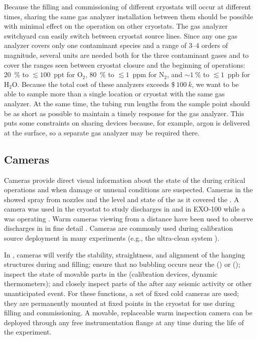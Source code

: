 Because the filling and commissioning of different cryostats will occur at different times, sharing the same gas analyzer installation between them should be possible with minimal effect on the operation on other cryostats. The gas analyzer switchyard can easily switch between cryostat source lines.
Since any one gas analyzer covers only one contaminant species and a range of \numrange{3}{4} orders of magnitude, several units are needed both for the three contaminant gases and to cover the ranges seen between cryostat closure and the beginning of  operations:
\SI{20}{\percent} to $\lesssim 100$~ppt for $\text{O}_2$,
\SI{80}{\percent} to $\lesssim 1$~ppm for $\text{N}_2$, and
$\sim \SI{1}{\percent}$ to $\lesssim 1$~ppb for $\text{H}_2\text{O}$.
Because the total cost of these analyzers exceeds $\SI{100}[\mathdollar]{k}$, we want to be able to  sample more than a single location or cryostat with the same gas analyzer. At the same time, the tubing run lengths from the sample point should be as short as possible to maintain a timely response for the gas analyzer. This puts some constraints on sharing devices because, for example, argon is delivered at the surface, so a separate gas analyzer may be required there. %


\subsection{Cameras}

Cameras provide direct visual information about the state of the
 during critical operations and when damage or unusual
conditions are suspected.  Cameras in the  showed spray from \cooldown
nozzles and the level and state of the \lar as it covered the  \cite{Murphy:20170516}.  A camera was
used in the  
cryostat\cite{Adamowski:2014daa} to study  discharges in
\lar and in EXO-100 while a  was operating
\cite{Delaquis:2013hva}.  Warm cameras viewing \lar from a distance
have been used to observe  discharges in \lar in
fine detail \cite{Auger:2015xlo}.  Cameras are commonly used during
calibration source deployment in many experiments (e.g., the
\kamland ultra-clean system \cite{Banks:2014hra}).

In , cameras will verify the stability, straightness,
and alignment of the hanging  structures during \cooldown and
filling; ensure that no bubbling occurs near the 
(\single) or  (\dual); inspect the
state of movable parts in the  (calibration devices, dynamic
thermometers); and closely inspect parts of the  after any seismic activity or other unanticipated
event.  For these functions, a set of fixed
cold cameras are used; they are permanently mounted at fixed points in the cryostat
for use during filling and commissioning. A movable, replaceable
warm inspection camera can be deployed through any free
instrumentation flange at any time during the life of the
experiment. 
 
